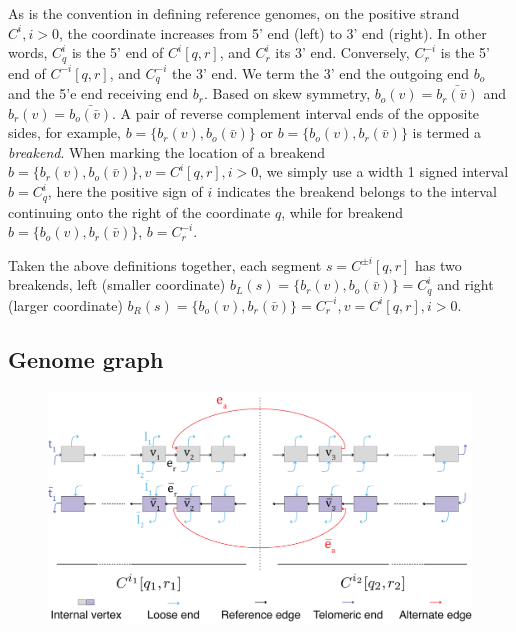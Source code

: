 \documentclass[phd,tocprelim]{cornell}
\renewcommand{\caption}[1]{\singlespacing\hangcaption{#1}\normalspacing}
\begin{document}
As is the convention in defining reference genomes, on the positive strand $C^i, i>0$, the coordinate increases from 5' end (left) to 3' end (right). In other words, $C^{i}_q$ is the 5' end of $C^{i}[q,r]$, and $C^{i}_r$ its 3' end. Conversely, $C^{-i}_r$ is the 5' end of $C^{-i}[q,r]$, and $C^{-i}_q$ the 3' end. We term the 3' end the outgoing end $b_o$ and the 5'e end receiving end $b_r$. Based on skew symmetry, $b_o (v)= \bar{b_r(\bar{v})}$ and $b_r(v) = \bar{b_o(\bar{v})}$. A pair of reverse complement interval ends of the opposite sides, for example, $b = \{b_r(v), b_o(\bar{v})\}$ or $b = \{b_o(v), b_r(\bar{v})\}$ is termed a \textit{breakend}. When marking the location of a breakend $b = \{b_r(v), b_o(\bar{v})\}, v = C^{i}[q,r], i>0$, we simply use a width 1 signed interval $b = C^{i}_{q}$, here the positive sign of $i$ indicates the breakend belongs to the interval continuing onto the right of the coordinate $q$, while for breakend $b = \{b_o(v), b_r(\bar{v})\}$, $b = C^{-i}_r$.

Taken the above definitions together, each segment $s = C^{\pm{i}}[q,r]$ has two breakends, left (smaller coordinate) $b_L(s) = \{b_r(v), b_o(\bar{v})\} = C^{i}_q$ and right (larger coordinate) $b_R(s) = \{b_o(v), b_r(\bar{v})\} = C^{-i}_{r}, v = C^{i}[q,r], i>0$.

\subsection{Genome graph}
\begin{figure}
    \centering
    \includegraphics[width=0.95\linewidth]{figures/600ppi/ggraph_schematic.png}
    \caption{Schematic of a genome graph}
    \label{fig:ggraph_schematic}
\end{figure}
\end{document}
